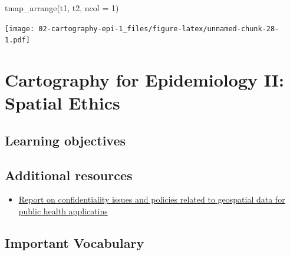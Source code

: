 \documentclass[
]{book}
\newenvironment{Shaded}{\begin{snugshade}}{\end{snugshade}}
\newcommand{\AttributeTok}[1]{\textcolor[rgb]{0.77,0.63,0.00}{#1}}
\newcommand{\DecValTok}[1]{\textcolor[rgb]{0.00,0.00,0.81}{#1}}
\newcommand{\FunctionTok}[1]{\textcolor[rgb]{0.00,0.00,0.00}{#1}}
\newcommand{\NormalTok}[1]{#1}
\providecommand{\tightlist}{%
  \setlength{\itemsep}{0pt}\setlength{\parskip}{0pt}}
\begin{document}
\begin{Shaded}
\begin{Highlighting}[]
\FunctionTok{tmap\_arrange}\NormalTok{(t1, t2, }\AttributeTok{ncol =} \DecValTok{1}\NormalTok{)}
\end{Highlighting}
\end{Shaded}

\texttt{[image: 02-cartography-epi-1\_files/figure-latex/unnamed-chunk-28-1.pdf]}

\hypertarget{cartography-for-epidemiology-ii-spatial-ethics}{%
\chapter{Cartography for Epidemiology II: Spatial Ethics}\label{cartography-for-epidemiology-ii-spatial-ethics}}

\hypertarget{learning-objectives-2}{%
\section{Learning objectives}\label{learning-objectives-2}}

\hypertarget{additional-resources-2}{%
\section{Additional resources}\label{additional-resources-2}}

\begin{itemize}
\tightlist
\item
  \href{http://www.ciesin.columbia.edu/pdf/SEDAC_ConfidentialityReport.pdf}{Report on confidentiality issues and policies related to geospatial data for public health applicatins}
\end{itemize}

\hypertarget{important-vocabulary-2}{%
\section{Important Vocabulary}\label{important-vocabulary-2}}

 
  \providecommand{\huxb}[2]{\arrayrulecolor[RGB]{#1}\global\arrayrulewidth=#2pt}
  \providecommand{\huxvb}[2]{\color[RGB]{#1}\vrule width #2pt}
  \providecommand{\huxtpad}[1]{\rule{0pt}{#1}}
  \providecommand{\huxbpad}[1]{\rule[-#1]{0pt}{#1}}
\end{document}
